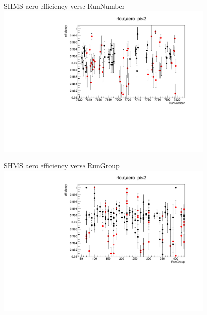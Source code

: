 \documentclass[aspectratio=169,xcolor=dvipsnames]{beamer}
\begin{document}
\begin{frame}{SHMS aero efficiency verse RunNumber}
  \includegraphics[width = 0.8\textwidth]{results/pid/SHMS_aero_DE_RunNumber_spring.pdf}
\end{frame}
\begin{frame}{SHMS aero efficiency verse RunGroup}
  \includegraphics[width = 0.8\textwidth]{results/pid/SHMS_aero_DE_RunGroup.pdf}
\end{frame}
\end{document}

